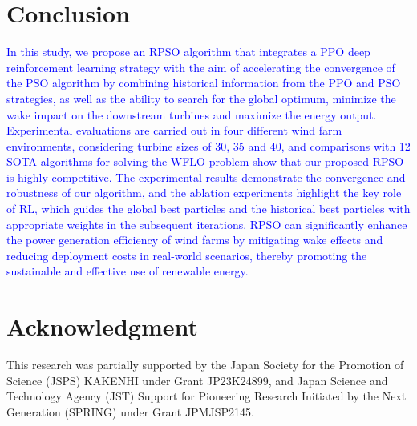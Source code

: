 \documentclass[review]{elsarticle}
\begin{document}
\section{Conclusion}\label{conclusion}
\textcolor{blue}{In this study, we propose an RPSO algorithm that integrates a PPO deep reinforcement learning strategy with the aim of accelerating the convergence of the PSO algorithm by combining historical information from the PPO and PSO strategies, as well as the ability to search for the global optimum, minimize the wake impact on the downstream turbines and maximize the energy output. Experimental evaluations are carried out in four different wind farm environments, considering turbine sizes of 30, 35 and 40, and comparisons with 12 SOTA algorithms for solving the WFLO problem show that our proposed RPSO is highly competitive. The experimental results demonstrate the convergence and robustness of our algorithm, and the ablation experiments highlight the key role of RL, which guides the global best particles and the historical best particles with appropriate weights in the subsequent iterations. RPSO can significantly enhance the power generation efficiency of wind farms by mitigating wake effects and reducing deployment costs in real-world scenarios, thereby promoting the sustainable and effective use of renewable energy.}

\section*{Acknowledgment}
This research was partially supported by the Japan Society for the Promotion of Science (JSPS) KAKENHI under Grant JP23K24899, and Japan Science and Technology Agency (JST) Support for Pioneering Research Initiated by the Next Generation (SPRING) under Grant JPMJSP2145.



\end{document}
